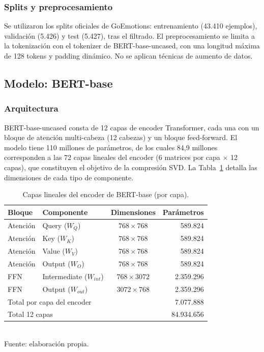 \subsubsection{Splits y preprocesamiento}

Se utilizaron los splits oficiales de GoEmotions: entrenamiento (43.410 ejemplos),
validación (5.426) y test (5.427), tras el filtrado. El preprocesamiento se limita a
la tokenización con el tokenizer de BERT-base-uncased, con una longitud máxima de
128 tokens y padding dinámico. No se aplican técnicas de aumento de datos.

\subsection{Modelo: BERT-base}
\label{sec:met-modelo}

\subsubsection{Arquitectura}

BERT-base-uncased \cite{devlin2019bert} consta de 12 capas de encoder Transformer,
cada una con un bloque de atención multi-cabeza (12 cabezas) y un bloque
feed-forward. El modelo tiene 110 millones de parámetros, de los cuales
84{,}9 millones corresponden a las 72 capas lineales del encoder (6 matrices por
capa $\times$ 12 capas), que constituyen el objetivo de la compresión SVD. La
Tabla~\ref{tab:capas-bert} detalla las dimensiones de cada tipo de componente.

\begin{table}[H]
    \centering
    \caption{Capas lineales del encoder de BERT-base (por capa).}
    \label{tab:capas-bert}
    \small
    \begin{tabular}{@{}l l c r@{}}
        \toprule
        Bloque & Componente & Dimensiones & Parámetros \\
        \midrule
        Atención & Query ($W_Q$)            & $768 \times 768$   & 589.824 \\
        Atención & Key ($W_K$)              & $768 \times 768$   & 589.824 \\
        Atención & Value ($W_V$)            & $768 \times 768$   & 589.824 \\
        Atención & Output ($W_O$)           & $768 \times 768$   & 589.824 \\
        FFN      & Intermediate ($W_{int}$) & $768 \times 3072$  & 2.359.296 \\
        FFN      & Output ($W_{out}$)       & $3072 \times 768$  & 2.359.296 \\
        \midrule
        \multicolumn{3}{l}{Total por capa del encoder} & 7.077.888 \\
        \multicolumn{3}{l}{Total 12 capas} & 84.934.656 \\
        \bottomrule
    \end{tabular}
    \\[0.15cm]{\small Fuente: elaboración propia.}
\end{table}

